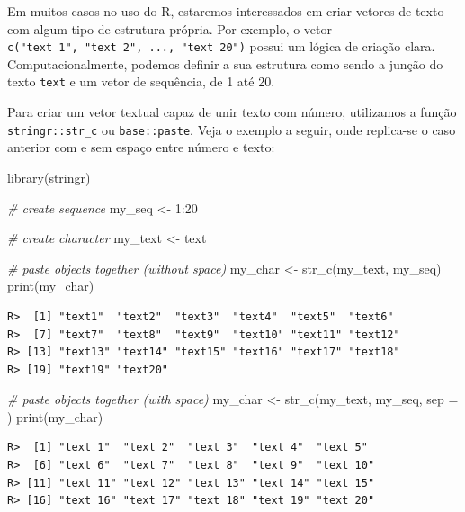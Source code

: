 \documentclass[
  11pt,
]{book}
\newenvironment{Shaded}{\begin{snugshade}}{\end{snugshade}}
\newcommand{\AttributeTok}[1]{\textcolor[rgb]{0.61,0.61,0.61}{#1}}
\newcommand{\CommentTok}[1]{\textcolor[rgb]{0.37,0.37,0.37}{\textit{#1}}}
\newcommand{\DecValTok}[1]{\textcolor[rgb]{0.06,0.06,0.06}{#1}}
\newcommand{\FunctionTok}[1]{\textcolor[rgb]{0,0,0}{#1}}
\newcommand{\NormalTok}[1]{#1}
\newcommand{\OtherTok}[1]{\textcolor[rgb]{0.37,0.37,0.37}{#1}}
\newcommand{\SpecialCharTok}[1]{\textcolor[rgb]{0,0,0}{#1}}
\newcommand{\StringTok}[1]{\textcolor[rgb]{0.5,0.5,0.5}{#1}}
\begin{document}
Em muitos casos no uso do R, estaremos interessados em criar vetores de texto com algum tipo de estrutura própria. Por exemplo, o vetor \texttt{c("text\ 1",\ "text\ 2",\ ...,\ "text\ 20")} possui um lógica de criação clara. Computacionalmente, podemos definir a sua estrutura como sendo a junção do texto \texttt{text} e um vetor de sequência, de 1 até 20.

Para criar um vetor textual capaz de unir texto com número, utilizamos a função \texttt{stringr::str\_c} ou \texttt{base::paste}. Veja o exemplo a seguir, onde replica-se o caso anterior com e sem espaço entre número e texto: 

\begin{Shaded}
\begin{Highlighting}[]
\FunctionTok{library}\NormalTok{(stringr)}

\CommentTok{\# create sequence}
\NormalTok{my\_seq }\OtherTok{\textless{}{-}} \DecValTok{1}\SpecialCharTok{:}\DecValTok{20}

\CommentTok{\# create character}
\NormalTok{my\_text }\OtherTok{\textless{}{-}} \StringTok{\textquotesingle{}text\textquotesingle{}}

\CommentTok{\# paste objects together (without space)}
\NormalTok{my\_char }\OtherTok{\textless{}{-}} \FunctionTok{str\_c}\NormalTok{(my\_text, my\_seq)}
\FunctionTok{print}\NormalTok{(my\_char)}
\end{Highlighting}
\end{Shaded}

\begin{verbatim}
R>  [1] "text1"  "text2"  "text3"  "text4"  "text5"  "text6" 
R>  [7] "text7"  "text8"  "text9"  "text10" "text11" "text12"
R> [13] "text13" "text14" "text15" "text16" "text17" "text18"
R> [19] "text19" "text20"
\end{verbatim}

\begin{Shaded}
\begin{Highlighting}[]
\CommentTok{\# paste objects together (with space)}
\NormalTok{my\_char }\OtherTok{\textless{}{-}} \FunctionTok{str\_c}\NormalTok{(my\_text, my\_seq, }\AttributeTok{sep =} \StringTok{\textquotesingle{} \textquotesingle{}}\NormalTok{)}
\FunctionTok{print}\NormalTok{(my\_char)}
\end{Highlighting}
\end{Shaded}

\begin{verbatim}
R>  [1] "text 1"  "text 2"  "text 3"  "text 4"  "text 5" 
R>  [6] "text 6"  "text 7"  "text 8"  "text 9"  "text 10"
R> [11] "text 11" "text 12" "text 13" "text 14" "text 15"
R> [16] "text 16" "text 17" "text 18" "text 19" "text 20"
\end{verbatim}
\end{document}
